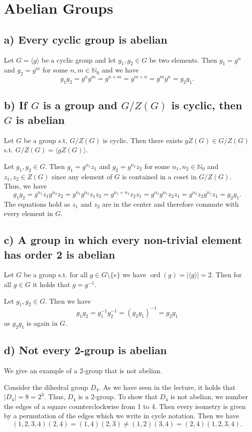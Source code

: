 \section{Abelian Groups}

\subsection*{a) Every cyclic group is abelian}
Let $G = \langle g \rangle$ be a cyclic group and let $g_1, g_2 \in G$ be two elements.
Then $g_1 = g^n$ and $g_2 = g^m$ for some $n, m \in \mathds{N}_0$ and we have
\[ g_1 g_2 = g^n g^m = g^{n+m} = g^{m+n} = g^m g^n = g_2 g_1. \]


\subsection*{b) If $G$ is a group and $G/Z(G)$ is cyclic, then $G$ is abelian}
Let $G$ be a group s.t. $G/Z(G)$ is cyclic. Then there exists $g Z(G) \in G/Z(G)$ s.t. $G/Z(G) = \langle g Z(G) \rangle$.

Let $g_1, g_2 \in G$. Then $g_1 = g^{n_1} z_1$ and $g_2 = g^{n_2} z_2$ for some $n_1, n_2 \in \mathds{N}_0$ and $z_1, z_2 \in Z(G)$ since any element of $G$ is contained in a coset in $G/Z(G)$. Thus, we have
\[ g_1 g_2 = g^{n_1} z_1 g^{n_2} z_2 = g^{n_1} g^{n_2} z_1 z_2 = g^{n_1 + n_2} z_2 z_1 = g^{n_2} g^{n_1} z_2 z_1 = g^{n_2} z_2 g^{n_1} z_1 = g_2 g_1. \]
The equations hold as $z_1$ and $z_2$ are in the center and therefore commute with every element in $G$.


\subsection*{c) A group in which every non-trivial element has order 2 is abelian}
Let $G$ be a group s.t. for all $g \in G \setminus \{e\}$ we have $\operatorname{ord}(g) = |\langle g \rangle| = 2$. Then for all $g \in G$ it holds that $g = g^{-1}$.

Let $g_1, g_2 \in G$. Then we have
\[ g_1 g_2 = g_1^{-1} g_2^{-1} = (g_2 g_1)^{-1} = g_2 g_1 \]
as $g_2 g_1$ is again in $G$.


\subsection*{d) Not every 2-group is abelian}
We give an example of a 2-group that is not abelian.

Consider the dihedral group $D_4$. As we have seen in the lecture, it holds that $|D_4| = 8 = 2^3$. Thus, $D_4$ is a 2-group. To show that $D_4$ is not abelian, we number the edges of a square counterclockwise from 1 to 4. Then every isometry is given by a permutation of the edges which we write in cycle notation. Then we have
\[ (1,2,3,4) (2,4) = (1,4) (2,3) \neq (1,2) (3,4) = (2,4) (1,2,3,4). \]
